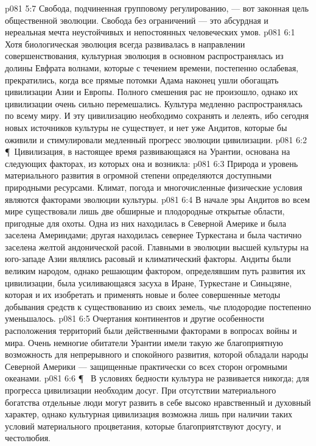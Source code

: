 \vs p081 5:7 Свобода, подчиненная групповому регулированию, --- вот законная цель общественной эволюции. Свобода без ограничений --- это абсурдная и нереальная мечта неустойчивых и непостоянных человеческих умов.
\vs p081 6:1 Хотя биологическая эволюция всегда развивалась в направлении совершенствования, культурная эволюция в основном распространялась из долины Евфрата волнами, которые с течением времени, постепенно ослабевая, прекратились, когда все прямые потомки Адама наконец ушли обогащать цивилизации Азии и Европы. Полного смешения рас не произошло, однако их цивилизации очень сильно перемешались. Культура медленно распространялась по всему миру. И эту цивилизацию необходимо сохранять и лелеять, ибо сегодня новых источников культуры не существует, и нет уже Андитов, которые бы оживили и стимулировали медленный прогресс эволюции цивилизации.
\vs p081 6:2 \P\ Цивилизация, в настоящее время развивающаяся на Урантии, основана на следующих факторах, из которых она и возникла:
\vs p081 6:3  Природа и уровень материального развития в огромной степени определяются доступными природными ресурсами. Климат, погода и многочисленные физические условия являются факторами эволюции культуры.
\vs p081 6:4 В начале эры Андитов во всем мире существовали лишь две обширные и плодородные открытые области, пригодные для охоты. Одна из них находилась в Северной Америке и была заселена Америндами; другая находилась севернее Туркестана и была частично заселена желтой андонической расой. Главными в эволюции высшей культуры на юго\hyp{}западе Азии являлись расовый и климатический факторы. Андиты были великим народом, однако решающим фактором, определявшим путь развития их цивилизации, была усиливающаяся засуха в Иране, Туркестане и Синьцзяне, которая и  их изобретать и применять новые и более совершенные методы добывания средств к существованию из своих земель, чье плодородие постепенно уменьшалось.
\vs p081 6:5 Очертания континентов и другие особенности расположения территорий были действенными факторами в вопросах войны и мира. Очень немногие обитатели Урантии имели такую же благоприятную возможность для непрерывного и спокойного развития, которой обладали народы Северной Америки --- защищенные практически со всех сторон огромными океанами.
\vs p081 6:6 \P\  В условиях бедности культура не развивается никогда; для прогресса цивилизации необходим досуг. При отсутствии материального богатства отдельные люди могут развить в себе высоко нравственный и духовный характер, однако культурная цивилизация возможна лишь при наличии таких условий материального процветания, которые благоприятствуют досугу, и честолюбия.
